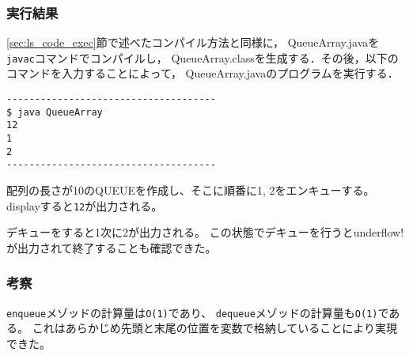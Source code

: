 \documentclass[10.5pt,a4paper]{jsarticle}
\newcommand{\secref}[1]{\ref{#1}節}
\begin{document}
\subsubsection{実行結果}

\secref{sec:ls_code_exec}で述べたコンパイル方法と同様に，
QueueArray.javaを\texttt{javac}コマンドでコンパイルし，
QueueArray.classを生成する．その後，以下のコマンドを入力することによって，
QueueArray.javaのプログラムを実行する．

\begin{verbatim}
-------------------------------------
$ java QueueArray
12
1
2
-------------------------------------
\end{verbatim}

配列の長さが10のQUEUEを作成し、そこに順番に1, 2をエンキューする。
displayすると\texttt{12}が出力される。

デキューをすると1次に2が出力される。
この状態でデキューを行うとunderflow!が出力されて終了することも確認できた。

\subsubsection{考察}
\texttt{enqueue}メゾッドの計算量は\texttt{O(1)}であり、
\texttt{dequeue}メゾッドの計算量も\texttt{O(1)}である。
これはあらかじめ先頭と末尾の位置を変数で格納していることにより実現できた。
\end{document}
